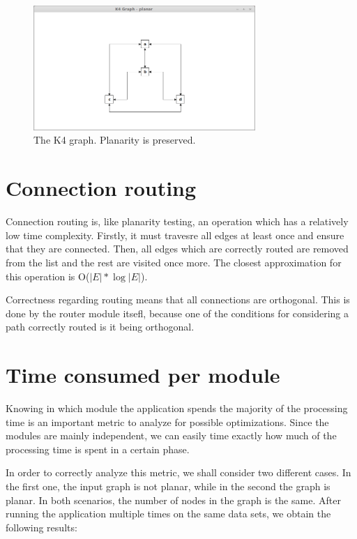 \begin{figure}[ht] \centering
\includegraphics[width=0.75\textwidth]{img/results/k4graph.png}
\caption{The K4 graph. Planarity is preserved.} \end{figure}

\section{Connection routing}

Connection routing is, like planarity testing, an operation which has a relatively low time complexity.
Firstly, it must travesre all edges at least once and ensure that they are connected. Then, all edges which 
are correctly routed are removed from the list and the rest are visited once more. The closest approximation 
for this operation is O($|E| * \log |E|$).

Correctness regarding routing means that all connections are orthogonal. This is done by the router module 
itsefl, because one of the conditions for considering a path correctly routed is it being orthogonal.

\section{Time consumed per module}

Knowing in which module the application spends the majority of the processing time is an important metric 
to analyze for possible optimizations. Since the modules are mainly independent, we can easily time exactly 
how much of the processing time is spent in a certain phase. 

In order to correctly analyze this metric, we shall consider two different cases. In the first one, the input 
graph is not planar, while in the second the graph is planar. In both scenarios, the number of nodes in the 
graph is the same. After running the application multiple times on the same data sets, we obtain the 
following results: 

